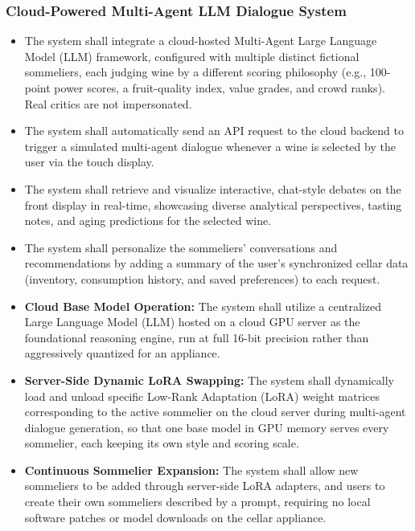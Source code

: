 \documentclass[conference]{IEEEtran}
\begin{document}
\subsubsection{Cloud-Powered Multi-Agent LLM Dialogue System}
\begin{itemize}
    \item The system shall integrate a cloud-hosted Multi-Agent Large Language Model (LLM) framework, configured with multiple distinct fictional sommeliers, each judging wine by a different scoring philosophy (e.g., 100-point power scores, a fruit-quality index, value grades, and crowd ranks). Real critics are not impersonated.
    \item The system shall automatically send an API request to the cloud backend to trigger a simulated multi-agent dialogue whenever a wine is selected by the user via the touch display.
    \item The system shall retrieve and visualize interactive, chat-style debates on the front display in real-time, showcasing diverse analytical perspectives, tasting notes, and aging predictions for the selected wine.
    \item The system shall personalize the sommeliers' conversations and recommendations by adding a summary of the user's synchronized cellar data (inventory, consumption history, and saved preferences) to each request.
    \item \textbf{Cloud Base Model Operation:} The system shall utilize a centralized Large Language Model (LLM) hosted on a cloud GPU server as the foundational reasoning engine, run at full 16-bit precision rather than aggressively quantized for an appliance.
    \item \textbf{Server-Side Dynamic LoRA Swapping:} The system shall dynamically load and unload specific Low-Rank Adaptation (LoRA) weight matrices corresponding to the active sommelier on the cloud server during multi-agent dialogue generation, so that one base model in GPU memory serves every sommelier, each keeping its own style and scoring scale.
    \item \textbf{Continuous Sommelier Expansion:} The system shall allow new sommeliers to be added through server-side LoRA adapters, and users to create their own sommeliers described by a prompt, requiring no local software patches or model downloads on the cellar appliance.
\end{itemize}
\end{document}
